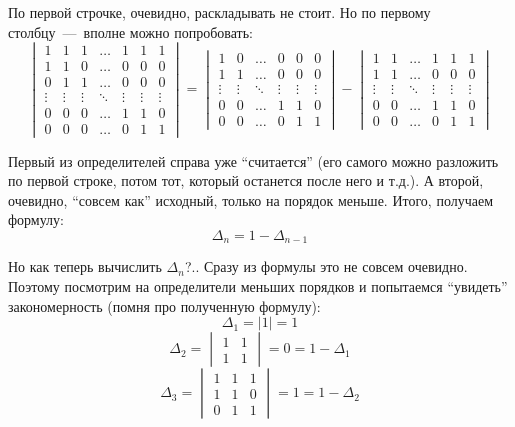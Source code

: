 \documentclass[a4paper,12pt]{article}
\theoremstyle{remark}
\begin{document}
  \begin{solution}
    По первой строчке, очевидно, раскладывать не стоит.
    Но по первому столбцу~---~вполне можно попробовать:
    \[
      \begin{vmatrix}
        1      & 1      & 1      & \ldots & 1      & 1      & 1\\
        1      & 1      & 0      & \ldots & 0      & 0      & 0\\
        0      & 1      & 1      & \ldots & 0      & 0      & 0\\
        \vdots & \vdots & \vdots & \ddots & \vdots & \vdots & \vdots\\
        0      & 0      & 0      & \ldots & 1      & 1      & 0\\
        0      & 0      & 0      & \ldots & 0      & 1      & 1
      \end{vmatrix}
      = \begin{vmatrix}
        1      & 0      & \ldots & 0      & 0      & 0\\
        1      & 1      & \ldots & 0      & 0      & 0\\
        \vdots & \vdots & \ddots & \vdots & \vdots & \vdots\\
        0      & 0      & \ldots & 1      & 1      & 0\\
        0      & 0      & \ldots & 0      & 1      & 1
      \end{vmatrix} - \begin{vmatrix}
        1      & 1      & \ldots & 1      & 1      & 1\\
        1      & 1      & \ldots & 0      & 0      & 0\\
        \vdots & \vdots & \ddots & \vdots & \vdots & \vdots\\
        0      & 0      & \ldots & 1      & 1      & 0\\
        0      & 0      & \ldots & 0      & 1      & 1
      \end{vmatrix}
    \]
    
    Первый из определителей справа уже ``считается'' (его самого можно разложить по первой строке, потом тот, который останется после него и т.д.).
    А второй, очевидно, ``совсем как'' исходный, только на порядок меньше.
    Итого, получаем формулу:
    \[
      \Delta_n = 1 - \Delta_{n-1}
    \]
    
    Но как теперь вычислить $\Delta_n$?..
    Сразу из формулы это не совсем очевидно.
    Поэтому посмотрим на определители меньших порядков и попытаемся ``увидеть'' закономерность (помня про полученную формулу):
    \[
      \Delta_1 = |1| = 1
    \]
    \[
      \Delta_2 = \begin{vmatrix}
        1 & 1\\
        1 & 1
      \end{vmatrix} = 0 = 1 - \Delta_1
    \]
    \[
      \Delta_3 = \begin{vmatrix}
        1 & 1 & 1\\
        1 & 1 & 0\\
        0 & 1 & 1
      \end{vmatrix} = 1 = 1 - \Delta_2
    \]
    

\end{solution}
\end{document}
